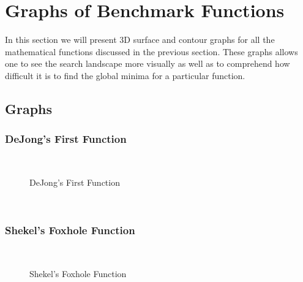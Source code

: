 \section{Graphs of Benchmark Functions}
In this section we will present 3D surface and contour graphs for all the mathematical functions discussed in the previous section. These graphs allows one to see the search landscape more visually as well as to comprehend how difficult it is to find the global minima for a particular function.

\subsection{Graphs}
\subsubsection{DeJong's First Function}
~
\begin{figure}[ht]
	\centering
	\setlength \fboxsep{0pt}
	\setlength \fboxrule{0.5pt}
	\caption{DeJong's First Function}
	\label{fig:DeJongF1Graph}
\end{figure}
~
\subsubsection{Shekel's Foxhole Function}
~
\begin{figure}[ht]
	\centering
	\setlength \fboxsep{0pt}
	\setlength \fboxrule{0.5pt}
	\caption{Shekel's Foxhole Function}
	\label{fig:ShekelGraph}
\end{figure}
~
